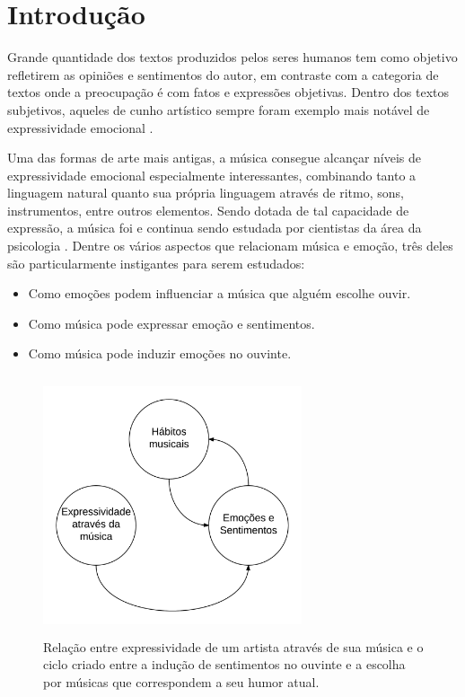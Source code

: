 \section{Introdução}


Grande quantidade dos textos produzidos pelos seres humanos tem como
objetivo refletirem as opiniões e sentimentos do autor, em contraste
com a categoria de textos onde a preocupação é com fatos e expressões
objetivas. Dentro dos textos subjetivos, aqueles de cunho artístico sempre foram exemplo mais notável de expressividade emocional
\cite{PJA57}.


Uma das formas de arte mais antigas, a música consegue alcançar
níveis de expressividade emocional especialmente interessantes, 
combinando tanto a linguagem natural quanto sua própria linguagem
através de ritmo, sons, instrumentos, entre outros elementos. Sendo
dotada de tal capacidade de expressão, a música foi e continua
sendo estudada por cientistas da área da psicologia
\cite{juslin2001music}. Dentre os 
vários aspectos que relacionam música e emoção, três deles são
particularmente instigantes para serem estudados:

\begin{itemize}
	\item Como emoções podem influenciar a música que alguém escolhe
	ouvir.
	\item Como música pode expressar emoção e sentimentos.
	\item Como música pode induzir emoções no ouvinte. 
\end{itemize}

\begin{figure}
\includegraphics[height=3in, width=3in]{music-mood.png}
\caption{Relação entre expressividade de um artista através de sua música
	e o ciclo criado entre a indução de sentimentos no ouvinte e a escolha
	por músicas que correspondem a seu humor atual.}
\label{fig:music-mood}
\end{figure}


